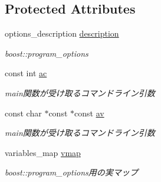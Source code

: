 \subsection*{Protected Attributes}
\begin{DoxyCompactItemize}
\item 
\mbox{\label{class_g_a_1_1_options_a20669586e0f3b564d5d94c93b677f050}} 
options\+\_\+description \mbox{\hyperlink{class_g_a_1_1_options_a20669586e0f3b564d5d94c93b677f050}{description}}
\begin{DoxyCompactList}\small\item\em boost\+::program\+\_\+options \end{DoxyCompactList}\item 
\mbox{\label{class_g_a_1_1_options_a3049a68a6be9163941d290a3c814bb95}} 
const int \mbox{\hyperlink{class_g_a_1_1_options_a3049a68a6be9163941d290a3c814bb95}{ac}}
\begin{DoxyCompactList}\small\item\em main関数が受け取るコマンドライン引数 \end{DoxyCompactList}\item 
\mbox{\label{class_g_a_1_1_options_af173d38c599bb7a18936fa789cf20834}} 
const char $\ast$const  $\ast$const \mbox{\hyperlink{class_g_a_1_1_options_af173d38c599bb7a18936fa789cf20834}{av}}
\begin{DoxyCompactList}\small\item\em main関数が受け取るコマンドライン引数 \end{DoxyCompactList}\item 
\mbox{\label{class_g_a_1_1_options_a3def8dc5a8eb71dfcfa4361904077628}} 
variables\+\_\+map \mbox{\hyperlink{class_g_a_1_1_options_a3def8dc5a8eb71dfcfa4361904077628}{vmap}}
\begin{DoxyCompactList}\small\item\em boost\+::program\+\_\+options用の実マップ \end{DoxyCompactList}\end{DoxyCompactItemize}
